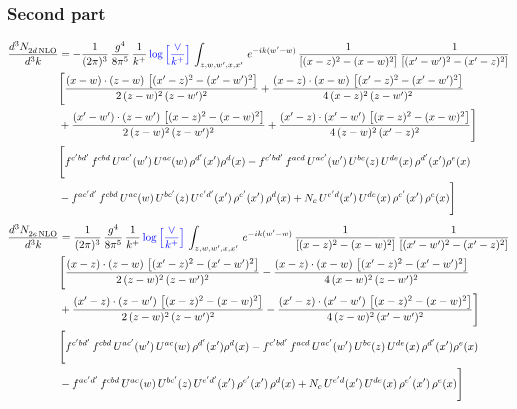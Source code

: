 \documentclass[9pt]{article}
\numberwithin{equation}{section}
\begin{document}
\subsubsection{Second part}
\begin{align}
 \frac{d^{3}N_{2d\,\rm NLO}^{\rm}}{d^{3}k}  & = -\frac{1}{(2\pi)^{3}}\, \frac{g^{4}}{8\pi^{5}}\,\frac{1}{k^{+}}\,{\color{blue}\log{\left[\frac{\vee}{k^{+}}\right]}}\,\int_{z,w,w^{\prime},x,x'}\, e^{-ik(w^{\prime}-w)}\,\frac{1}{\left[(x-z)^{2}-(x-w)^{2}\right]}\, \frac{1}{\left[(x'-w')^{2}-(x'-z)^{2}\right]}\notag \\ & \Bigg[\frac{(x-w)\cdot (z-w)\, \left[(x'-z)^{2}-(x'-w')^{2}\right]}{2\, (z-w)^{2}\, (z-w')^{2}}  + \frac{(x-z)\cdot (x-w)\,\left[(x'-z)^{2}-(x'-w')^{2}\right] }{4\,(x-z)^{2}\,(z-w')^{2}}\notag \\ & +\frac{(x'-w')\cdot (z-w')\, \left[(x-z)^{2}-(x-w)^{2}\right]}{2\, (z-w)^{2}\, (z-w')^{2}}+ \frac{(x'-z)\cdot (x'-w')\, \left[(x-z)^{2}-(x-w)^{2}\right]}{4\, (z-w)^{2}\,(x'-z)^{2}}\Bigg] \notag \\ &  \Bigg[f^{c'bd'}\,f^{cbd}\, U^{ac'}(w')\,U^{ac}(w)\,\rho^{d'}(x')\rho^{d}(x)- f^{c'bd'}\,f^{acd}\,U^{ac'}(w')\,U^{bc}(z)\,U^{de}(x)\,\rho^{d'}(x')\rho^{e}(x) \notag \\ & -f^{ac'd'}\,f^{cbd}\,U^{ac}(w)\,U^{bc'}(z)\,U^{e'd'}(x')\,\rho^{e'}(x')\,\rho^{d}(x) +N_{c}\,U^{e'd}(x')\,U^{de}(x)\,\rho^{e'}(x')\,\rho^{e}(x)\Bigg]
\end{align}
\begin{align}
 \frac{d^{3}N_{2e\,\rm NLO}^{\rm}}{d^{3}k}  & = \frac{1}{(2\pi)^{3}}\, \frac{g^{4}}{8\pi^{5}}\,\frac{1}{k^{+}}\,{\color{blue}\log{\left[\frac{\vee}{ k^{+}}\right]}}\,\int_{z,w,w^{\prime},x,x'}\, e^{-ik(w^{\prime}-w)}\, \frac{1}{\left[(x-z)^{2}-(x-w)^{2}\right]}\, \frac{1}{\left[(x'-w')^{2} - (x'-z)^{2}\right]} \notag \\ & \Bigg[\frac{(x-z)\cdot (z-w)\, \left[(x'-z)^{2}-(x'-w')^{2}\right]}{2\, (z-w)^{2}\, (z-w')^{2}}  - \frac{(x-z)\cdot (x-w)\,\left[(x'-z)^{2}-(x'-w')^{2}\right] }{4\,(x-w)^{2}\,(z-w')^{2}}\notag \\ & +\frac{(x'-z)\cdot (z-w')\, \left[(x-z)^{2}-(x-w)^{2}\right]}{2\, (z-w)^{2}\, (z-w')^{2}}-\frac{(x'-z)\cdot (x'-w')\, \left[(x-z)^{2}-(x-w)^{2}\right]}{4\, (z-w)^{2}\,(x'-w')^{2}}\Bigg]\notag \\ & \Bigg[f^{c'bd'}\,f^{cbd}\, U^{ac'}(w')\,U^{ac}(w)\,\rho^{d'}(x')\rho^{d}(x)- f^{c'bd'}\,f^{acd}\,U^{ac'}(w')\,U^{bc}(z)\,U^{de}(x)\,\rho^{d'}(x')\rho^{e}(x) \notag \\ & -f^{ac'd'}\,f^{cbd}\,U^{ac}(w)\,U^{bc'}(z)\,U^{e'd'}(x')\,\rho^{e'}(x')\,\rho^{d}(x) +N_{c}\,U^{e'd}(x')\,U^{de}(x)\,\rho^{e'}(x')\,\rho^{e}(x)\Bigg]
\end{align}
\end{document}
